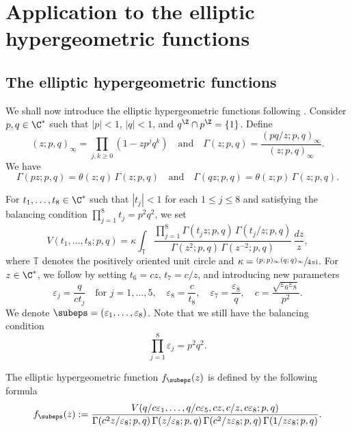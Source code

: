 \section{Application to the elliptic hypergeometric functions}\label{sec4}

\subsection{The elliptic hypergeometric functions}\label{sec33}

We shall now introduce the elliptic hypergeometric functions following \cite{spiridonov2016elliptic}. Consider $p,q \in \C^{*}$ such that $\vert p \vert < 1$, $\vert q \vert < 1$, and $q^{\Z} \cap p^{\Z}=\{1\}$. Define
\[
(z;p,q)_{\infty}= \prod_{j,k\geq 0}(1-zp^{j}q^{k}) \quad\text{and}\quad
\Gamma (z;p,q)=\frac{(pq/z;p,q)_{\infty}}{(z;p,q)_{\infty}}.
\]
We have
\[
\Gamma (pz;p,q)=\theta (z;q)\,\Gamma (z;p,q)\quad\text{and} \quad \Gamma (qz;p,q)=\theta (z;p)\,\Gamma (z;p,q).
\]

For $t_{1},\ldots,t_{8}\in \C^{*}$ such that $|t_j|<1$ for each $1\leq j\leq 8$ and satisfying the balancing condition
$\prod_{j=1}^{8}t_{j} =p^{2}q^{2}$, we set
\begin{equation}\label{v-function}V(t_{1},\dots,t_{8};p,q)=\kappa \int_{\mathbb{T}}\frac{\prod_{j=1}^{8}\Gamma (t_{j}z;p,q)\,\Gamma (t_{j}/z;p,q)}{\Gamma (z^{2};p,q)\,\Gamma (z^{-2};p,q)}\,\frac{dz}{z},\end{equation}
where $\mathbb{T}$ denotes the positively oriented unit circle and $\kappa=\sfrac{(p;p)_{\infty}(q;q)_{\infty}}{4\pi \mathrm{i}}$. For $z \in \C^{*}$, we follow \cite{spiridonov2016elliptic} by setting $t_{6}=cz$, $t_{7}=c/z$, and introducing new parameters
\begin{equation}\label{epsilon-parameters}\varepsilon_{j}=\frac{q}{ct_{j}} \quad\text{for } j=1,\dots,5,\quad \varepsilon_{8}=\frac{c}{t_{8}},\quad \varepsilon_{7}=\frac{\varepsilon_{8}}{q},\quad c=\frac{\sqrt{\varepsilon_{6}\varepsilon_{8}}}{p^{2}}. \end{equation}
We denote $\subeps=(\varepsilon_1,\dots,\varepsilon_8)$. Note that we still have the balancing condition
\begin{equation}\label{eq4}
\prod_{j=1}^{8}\varepsilon_{j} =p^{2}q^{2}.
\end{equation}

\begin{defi}\label{defi2}
The elliptic hypergeometric function $f_{\subeps}(z)$ is defined
by the following formula
\[
f_{\subeps}(z):=\frac{V(q/c\varepsilon_{1},\dots,q/c\varepsilon_{5},cz,c/z,c\varepsilon_{8};p,q)}{\Gamma (c^{2}z/\varepsilon_{8};p,q)\,\Gamma (z/\varepsilon_{8};p,q)\,\Gamma (c^{2}/z\varepsilon_{8};p,q)\,\Gamma (1/z\varepsilon_{8};p,q)}.
\]
\end{defi}

